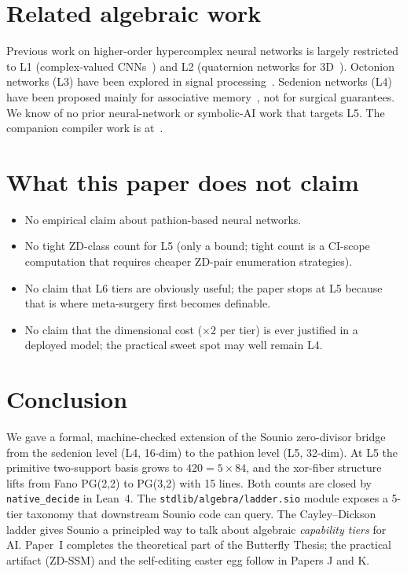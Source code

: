 \documentclass{article}
\begin{document}
\section{Related algebraic work}

Previous work on higher-order hypercomplex neural networks is
largely restricted to L1 (complex-valued CNNs~\cite{trabelsi2018deep})
and L2 (quaternion networks for 3D~\cite{parcollet2020quaternion}).
Octonion networks (L3) have been explored in signal
processing~\cite{octocomp2022}.  Sedenion networks (L4) have been
proposed mainly for associative memory~\cite{sedenionmem2021}, not
for surgical guarantees.  We know of no prior neural-network or
symbolic-AI work that targets L5.  The companion compiler work is
at~\cite{sounio2026zd}.

\section{What this paper does not claim}

\begin{itemize}
  \item No empirical claim about pathion-based neural networks.
  \item No tight ZD-class count for L5 (only a bound; tight count
        is a CI-scope computation that requires cheaper ZD-pair
        enumeration strategies).
  \item No claim that L6 tiers are obviously useful; the paper
        stops at L5 because that is where meta-surgery first
        becomes definable.
  \item No claim that the dimensional cost ($\times 2$ per tier) is
        ever justified in a deployed model; the practical sweet
        spot may well remain L4.
\end{itemize}

\section{Conclusion}

We gave a formal, machine-checked extension of the Sounio
zero-divisor bridge from the sedenion level (L4, 16-dim) to the
pathion level (L5, 32-dim).  At L5 the primitive two-support basis
grows to $420 = 5\times 84$, and the xor-fiber structure lifts from
Fano PG(2,2) to PG(3,2) with 15 lines.  Both counts are closed by
\texttt{native\_decide} in Lean~4.  The \texttt{stdlib/algebra/ladder.sio}
module exposes a 5-tier taxonomy that downstream Sounio code can
query.  The Cayley--Dickson ladder gives Sounio a principled way
to talk about algebraic \emph{capability tiers} for AI.  Paper~I
completes the theoretical part of the Butterfly Thesis; the
practical artifact (ZD-SSM) and the self-editing easter egg follow
in Papers J and K.
\end{document}

